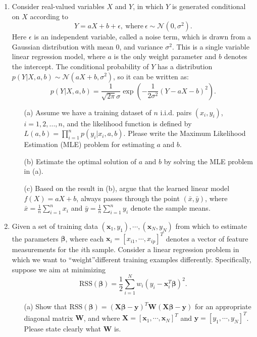\documentclass[10pt]{article}
\begin{document}
\begin{enumerate}[1.]
	\item {} Consider real-valued variables $X$ and $Y$, in which $Y$ is generated conditional on $X$ according to
	      $$
		      Y = aX + b + \epsilon, \ \text{where} \ \epsilon \sim \mathcal{N}(0, \sigma^2).
	      $$
	      Here $\epsilon$ is an independent variable, called a noise term, which is drawn from a Gaussian distribution with mean 0,
	      and variance $\sigma^2$. This is a single variable linear regression model, where $a$ is the only weight parameter and $b$ denotes the intercept.
	      The conditional probability of $Y$ has a distribution $p(Y | X, a, b) \sim \mathcal{N}(aX+b, \sigma^2)$, so it can be written as:
	      $$
		      p(Y|X, a,b) = \frac{1}{\sqrt{2\pi}\sigma}\exp\left(-\frac{1}{2\sigma^2}(Y - aX -b)^2\right).
	      $$
	      \begin{itemize}
		      \item[(a)] Assume we have a training dataset of $n$ i.i.d. pairs $(x_i, y_i)$, $i = 1, 2, ..., n$, and
		            the likelihood function is defined by $L(a,b) = \prod_{i=1}^n p(y_i | x_i, a, b)$. Please write the
		            Maximum Likelihood Estimation (MLE) problem for estimating $a$ and $b$.~
		      \item[(b)] Estimate the optimal solution of $a$ and $b$ by solving the MLE problem in (a).~
		      \item[(c)] Based on the result in (b), argue that the learned linear model $f(X) = aX + b$,
		            always passes through the point $(\bar{x},\bar{y})$,
		            where $\bar{x} = \tfrac{1}{n}\sum_{i=1}^{n}x_{i}$ and $\bar{y} = \tfrac{1}{n}\sum_{i=1}^{n}y_{i}$ denote the sample means.~
	      \end{itemize}





	      \newpage

	\item {} Given a set of training data $(\mathbf{x}_{1},y_1),\cdots,(\mathbf{x}_{N},y_N)$ from which to estimate the parameters $\bm{\beta}$,
	      where each $\mathbf{x}_{i} = \left[x_{i1},\cdots,x_{ip} \right]^{T}$ denotes a vector of feature measurements for the $i$th sample.
	      Consider a linear regression problem in which we want to \textquotedblleft weight\textquotedblright different training examples differently.
	      Specifically, suppose we aim at minimizing
	      \begin{equation}
		      \textrm{RSS}(\bm{\beta}) = \frac{1}{2}\sum_{i=1}^{N}w_{i}(y_{i} -\mathbf{x}_{i}^{T}\bm{\beta})^{2}.
		      \label{eq:3}
	      \end{equation}
	      \begin{itemize}
		      \item[(a)] Show that $\textrm{RSS}(\bm{\beta}) = (\mathbf{X}\bm{\beta} - \mathbf{y})^{T}\mathbf{W}(\mathbf{X}\bm{\beta}-\mathbf{y})$
		            for an appropriate diagonal matrix $\mathbf{W}$, and where $\mathbf{X} = \left[\mathbf{x}_{1},\cdots,\mathbf{x}_{N} \right]^{T}$ and $\mathbf{y} = \left[y_1,\cdots,y_N \right]^{T}$.
		            Please state clearly what $\mathbf{W}$ is. ~


\end{itemize}
\end{enumerate}
\end{document}
